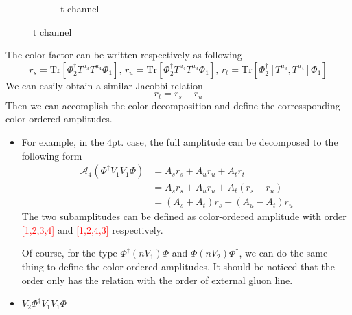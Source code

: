 \documentclass{beamer}
\begin{document}
\begin{frame}
\begin{itemize}
\begin{figure}
\begin{subfigure}{0.3\textwidth}
              \caption{t channel}
            \end{subfigure}
          \end{figure}
        The color factor can be written respectively as following
        \begin{equation*}
            r_s=\mathrm{Tr}[\Phi_2^\dagger T^{a_3}T^{a_4}\Phi_1],\,r_u=\mathrm{Tr}[\Phi_2^\dagger T^{a_4}T^{a_3}\Phi_1],\,
            r_t=\mathrm{Tr}[\Phi_2^\dagger [T^{a_3},T^{a_4}]\Phi_1]
        \end{equation*}
        We can easily obtain a similar Jacobbi relation
        \begin{equation*}
            r_t=r_s-r_u
        \end{equation*}
        Then we can accomplish the color decomposition and define the corressponding color-ordered amplitudes.
    \end{itemize}
\end{frame}

\begin{frame}
    \begin{itemize}
        \item[] For example, in the 4pt. case, the full amplitude can be decomposed to the following form
        \begin{align*}
            \mathcal{A}_4(\Phi^\dagger V_1V_1\Phi)&=A_s r_s+A_u r_u+A_t r_t\\
            &=A_s r_s+A_u r_u+A_t(r_s-r_u)\\
            &=(A_s+A_t)r_s+(A_u-A_t)r_u
        \end{align*}
        The two subamplitudes can be defined as color-ordered amplitude with order \textcolor{red}{[1,2,3,4]} and 
        \textcolor{red}{[1,2,4,3]} respectively.

        \vspace{0.5em}
        Of course, for the type $\Phi^\dagger(nV_1)\Phi$ and $\Phi (nV_2) \Phi^\dagger$, we can do the same thing to define the color-ordered amplitudes.
        It should be noticed that the order only has the relation with the order of external gluon line.
        \begin{equation*}
            [1,2,\sigma(3),\sigma(4),\cdots,\sigma(n)]
        \end{equation*}
    \end{itemize}
\end{frame}

\begin{frame}
    \begin{itemize}
        \item $V_2\Phi^\dagger V_1V_1\Phi$
    \end{itemize}
\end{frame}
\end{document}
